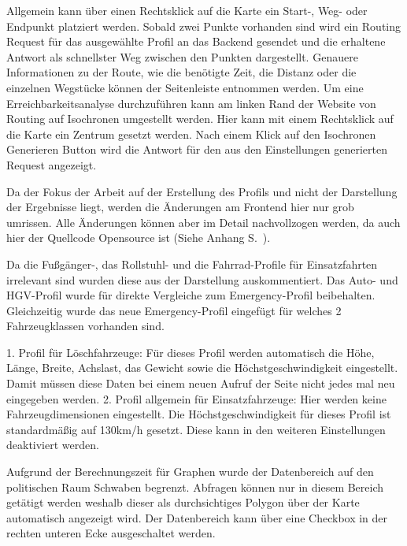 Allgemein kann über einen Rechtsklick auf die Karte ein Start-, Weg- oder Endpunkt platziert werden.
Sobald zwei Punkte vorhanden sind wird ein Routing Request für das ausgewählte Profil an das Backend gesendet und die erhaltene Antwort als schnellster Weg zwischen den Punkten dargestellt.
Genauere Informationen zu der Route, wie die benötigte Zeit, die Distanz oder die einzelnen Wegstücke können der Seitenleiste entnommen werden.
Um eine Erreichbarkeitsanalyse durchzuführen kann am linken Rand der Website von Routing auf Isochronen umgestellt werden.
Hier kann mit einem Rechtsklick auf die Karte ein Zentrum gesetzt werden.
Nach einem Klick auf den Isochronen Generieren Button wird die Antwort für den aus den Einstellungen generierten Request angezeigt.

\bigskip

Da der Fokus der Arbeit auf der Erstellung des Profils und nicht der Darstellung der Ergebnisse liegt, werden die Änderungen am Frontend hier nur grob umrissen.
Alle Änderungen können aber im Detail nachvollzogen werden, da auch hier der Quellcode Opensource ist (Siehe Anhang S.~\pageref{sec:anhang}).

\bigskip

Da die Fußgänger-, das Rollstuhl- und die Fahrrad-Profile für Einsatzfahrten irrelevant sind wurden diese aus der Darstellung auskommentiert.
Das Auto- und HGV-Profil wurde für direkte Vergleiche zum Emergency-Profil beibehalten.
Gleichzeitig wurde das neue Emergency-Profil eingefügt für welches 2 Fahrzeugklassen vorhanden sind.

\bigskip

1. Profil für Löschfahrzeuge: Für dieses Profil werden automatisch die Höhe, Länge, Breite, Achslast, das Gewicht sowie die Höchstgeschwindigkeit eingestellt.
Damit müssen diese Daten bei einem neuen Aufruf der Seite nicht jedes mal neu eingegeben werden.
2. Profil allgemein für Einsatzfahrzeuge: Hier werden keine Fahrzeugdimensionen eingestellt.
Die Höchstgeschwindigkeit für dieses Profil ist standardmäßig auf 130km/h gesetzt.
Diese kann in den weiteren Einstellungen deaktiviert werden.

\bigskip

Aufgrund der Berechnungszeit für Graphen wurde der Datenbereich auf den politischen Raum Schwaben begrenzt.
Abfragen können nur in diesem Bereich getätigt werden weshalb dieser als durchsichtiges Polygon über der Karte automatisch angezeigt wird.
Der Datenbereich kann über eine Checkbox in der rechten unteren Ecke ausgeschaltet werden.
